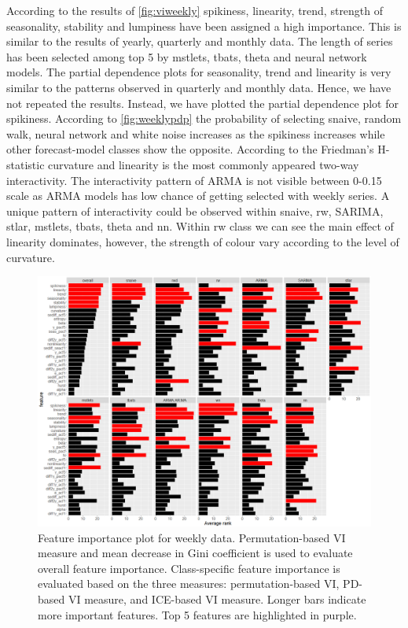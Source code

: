 \documentclass[11pt,a4paper,]{article}
\begin{document}
According to the results of \autoref{fig:viweekly} spikiness, linearity, trend, strength of seasonality, stability and lumpiness have been assigned a high importance. This is similar to the results of yearly, quarterly and monthly data. The length of series has been selected among top 5 by mstlets, tbats, theta and neural network models. The partial dependence plots for seasonality, trend and linearity is very similar to the patterns observed in quarterly and monthly data. Hence, we have not repeated the results. Instead, we have plotted the partial dependence plot for spikiness. According to \autoref{fig:weeklypdp} the probability of selecting snaive, random walk, neural network and white noise increases as the spikiness increases while other forecast-model classes show the opposite. According to the Friedman's H-statistic curvature and linearity is the most commonly appeared two-way interactivity. The interactivity pattern of ARMA is not visible between 0-0.15 scale as ARMA models has low chance of getting selected with weekly series. A unique pattern of interactivity could be observed within snaive, rw, SARIMA, stlar, mstlets, tbats, theta and nn. Within rw class we can see the main effect of linearity dominates, however, the strength of colour vary according to the level of curvature.

\begin{figure}[h]

{\centering \includegraphics{figures/viweekly-1} 

}

\caption{Feature importance plot for weekly data. Permutation-based VI measure and mean decrease in Gini coefficient is used to evaluate overall feature importance. Class-specific feature importance is evaluated based on the three measures: permutation-based VI, PD-based VI measure, and ICE-based VI measure. Longer bars indicate more important features. Top 5 features are highlighted in purple.}\label{fig:viweekly}
\end{figure}
\end{document}
